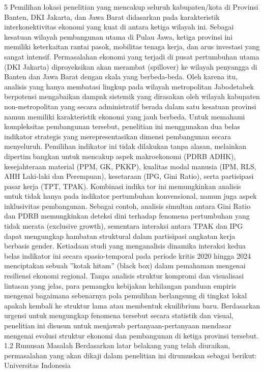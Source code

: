 5
Pemilihan lokasi penelitian yang mencakup seluruh kabupaten/kota di Provinsi Banten,
DKI Jakarta, dan Jawa Barat didasarkan pada karakteristik interkonektivitas ekonomi yang
kuat di antara ketiga wilayah ini. Sebagai kesatuan wilayah pembangunan utama di Pulau
Jawa, ketiga provinsi ini memiliki keterkaitan rantai pasok, mobilitas tenaga kerja, dan arus
investasi yang sangat intensif. Permasalahan ekonomi yang terjadi di pusat pertumbuhan
utama (DKI Jakarta) diproyeksikan akan merambat (spillover) ke wilayah penyangga di
Banten dan Jawa Barat dengan skala yang berbeda-beda. Oleh karena itu, analisis yang
hanya membatasi lingkup pada wilayah metropolitan Jabodetabek berpotensi mengabaikan
dampak sistemik yang dirasakan oleh wilayah kabupaten non-metropolitan yang secara
administratif berada dalam satu kesatuan provinsi namun memiliki karakteristik ekonomi
yang jauh berbeda.
Untuk memahami kompleksitas pembangunan tersebut, penelitian ini menggunakan
dua belas indikator strategis yang merepresentasikan dimensi pembangunan secara
menyeluruh. Pemilihan indikator ini tidak dilakukan tanpa alasan, melainkan dipertimbangkan untuk mencakup aspek makroekonomi (PDRB ADHK), kesejahteraan material
(PPM, GK, PKKP), kualitas modal manusia (IPM, RLS, AHH Laki-laki dan Perempuan),
kesetaraan (IPG, Gini Ratio), serta partisipasi pasar kerja (TPT, TPAK). Kombinasi indikator ini memungkinkan analisis untuk tidak hanya pada indikator pertumbuhan konvensional,
namun juga aspek inklusivitas pembangunan. Sebagai contoh, analisis simultan antara Gini
Ratio dan PDRB memungkinkan deteksi dini terhadap fenomena pertumbuhan yang tidak
merata (exclusive growth), sementara interaksi antara TPAK dan IPG dapat mengungkap
hambatan struktural dalam partisipasi angkatan kerja berbasis gender.
Ketiadaan studi yang menganalisis dinamika interaksi kedua belas indikator ini secara
spasio-temporal pada periode kritis 2020 hingga 2024 menciptakan sebuah ”kotak hitam”
(black box) dalam pemahaman mengenai resiliensi ekonomi regional. Tanpa analisis
struktur kompromi dan visualisasi lintasan yang jelas, para pemangku kebijakan kehilangan
panduan empiris mengenai bagaimana sebenarnya pola pemulihan berlangsung di tingkat
lokal apakah kembali ke struktur lama atau membentuk ekuilibrium baru. Berdasarkan
urgensi untuk mengungkap fenomena tersebut secara statistik dan visual, penelitian ini
disusun untuk menjawab pertanyaan-pertanyaan mendasar mengenai evolusi struktur
ekonomi dan pembangunan di ketiga provinsi tersebut.
1.2 Rumusan Masalah
Berdasarkan latar belakang yang telah diuraikan, permasalahan yang akan dikaji dalam
penelitian ini dirumuskan sebagai berikut:
Universitas Indonesia

